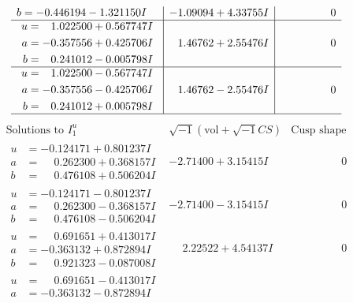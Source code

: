 \documentclass[1p]{elsarticle_modified}
\theoremstyle{definition}
\newcommand{\I}{\sqrt{-1}}
\begin{document}
$$\begin{array}{c|c|c}
\begin{aligned}
b &= -0.446194 - 1.321150 I\end{aligned}
 & -1.09094 + 4.33755 I & \phantom{-0.000000 } 0 \\ \hline\begin{aligned}
u &= \phantom{-}1.022500 + 0.567747 I \\
a &= -0.357556 + 0.425706 I \\
b &= \phantom{-}0.241012 - 0.005798 I\end{aligned}
 & \phantom{-}1.46762 + 2.55476 I & \phantom{-0.000000 } 0 \\ \hline\begin{aligned}
u &= \phantom{-}1.022500 - 0.567747 I \\
a &= -0.357556 - 0.425706 I \\
b &= \phantom{-}0.241012 + 0.005798 I\end{aligned}
 & \phantom{-}1.46762 - 2.55476 I & \phantom{-0.000000 } 0\\
 \hline 
 \end{array}$$\newpage$$\begin{array}{c|c|c}  
\text{Solutions to }I^u_{1}& \I (\text{vol} + \sqrt{-1}CS) & \text{Cusp shape}\\
 \hline 
\begin{aligned}
u &= -0.124171 + 0.801237 I \\
a &= \phantom{-}0.262300 + 0.368157 I \\
b &= \phantom{-}0.476108 + 0.506204 I\end{aligned}
 & -2.71400 + 3.15415 I & \phantom{-0.000000 } 0 \\ \hline\begin{aligned}
u &= -0.124171 - 0.801237 I \\
a &= \phantom{-}0.262300 - 0.368157 I \\
b &= \phantom{-}0.476108 - 0.506204 I\end{aligned}
 & -2.71400 - 3.15415 I & \phantom{-0.000000 } 0 \\ \hline\begin{aligned}
u &= \phantom{-}0.691651 + 0.413017 I \\
a &= -0.363132 + 0.872894 I \\
b &= \phantom{-}0.921323 - 0.087008 I\end{aligned}
 & \phantom{-}2.22522 + 4.54137 I & \phantom{-0.000000 } 0 \\ \hline\begin{aligned}
u &= \phantom{-}0.691651 - 0.413017 I \\
a &= -0.363132 - 0.872894 I \\

\end{aligned}
\end{array}$$
\end{document}
